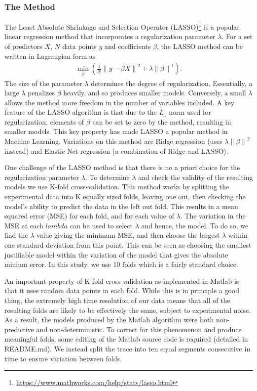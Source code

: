 \documentclass[11pt,a4paper,oneside]{article}
\newcommand{\norm}[1]{\left\lVert#1\right\rVert}
\begin{document}
\subsubsection{The Method}
The Least Absolute Shrinkage and Selection Operator (LASSO)\footnote{\url{https://www.mathworks.com/help/stats/lasso.html}} is a popular linear regression method that incorporates a regularization parameter $\lambda$. For a set of predictors $X$, $N$ data points $y$ and coefficients $\beta$, the LASSO method can be written in Lagrangian form as
\begin{align}
	\min_{\beta} ( \frac{1}{N} \norm{ y - \beta X }^2 + \lambda \norm{ \beta }^1 ).
\end{align}
The size of the parameter $\lambda$ determines the degree of regularization. Essentially, a large $\lambda$ penalizes $\beta$ heavily, and so produces smaller models. Conversely, a small $\lambda$ allows the method more freedom in the number of variables included. A key feature of the LASSO algorithm is that due to the $L_1$ norm used for regularization, elements of $\beta$ can be set to zero by the method, resulting in smaller models. This key property has made LASSO a popular method in Machine Learning. Variations on this method are Ridge regression (uses $\lambda \norm{ \beta }^2$ instead) and Elastic Net regression (a combination of Ridge and LASSO).

One challenge of the LASSO method is that there is no a priori choice for the regularization parameter $\lambda$. To determine $\lambda$ and check the validity of the resulting models we use K-fold cross-validation. This method works by splitting the experimental data into K equally sized folds, leaving one out, then checking the model's ability to predict the data in the left out fold. This results in a mean squared error (MSE) for each fold, and for each value of $\lambda$. The variation in the MSE at each $lambda$ can be used to select $\lambda$ and hence, the model. To do so, we find the $\lambda$ value giving the minimum MSE, and then choose the largest $\lambda$ within one standard deviation from this point. This can be seen as choosing the smallest justifiable  model within the variation of the model that gives the absolute minium error. In this study, we use 10 folds which is a fairly standard choice.

An important property of K-fold cross-validation as inplemented in Matlab is that it uses random data points in each fold. While this is in principle a good thing, the extremely high time resolution of our data means that all of the resulting folds are likely to be effectively the same, subject to experimental noise. As a result, the models produced by the Matlab algorithm were both non-predictive and non-deterministic. To correct for this phenomenon and produce meaningful folds, some editing of the Matlab source code is required (detailed in README.md). We instead split the trace into ten equal segments consecutive in time to ensure variation between folds.
\end{document}

